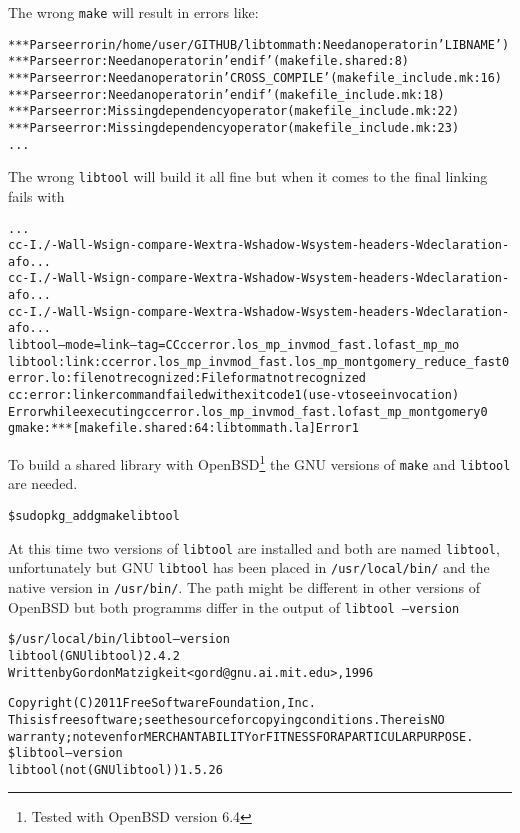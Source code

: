 \documentclass[synpaper]{book}
\begin{document}
The wrong \texttt{make} will result in errors like:
\begin{alltt}
*** Parse error in /home/user/GITHUB/libtommath: Need an operator in 'LIBNAME' )
*** Parse error: Need an operator in 'endif' (makefile.shared:8)
*** Parse error: Need an operator in 'CROSS_COMPILE' (makefile_include.mk:16)
*** Parse error: Need an operator in 'endif' (makefile_include.mk:18)
*** Parse error: Missing dependency operator (makefile_include.mk:22)
*** Parse error: Missing dependency operator (makefile_include.mk:23)
...
\end{alltt}
The wrong \texttt{libtool} will build it all fine but when it comes to the final linking fails with
\begin{alltt}
...
cc -I./ -Wall -Wsign-compare -Wextra -Wshadow -Wsystem-headers -Wdeclaration-afo...
cc -I./ -Wall -Wsign-compare -Wextra -Wshadow -Wsystem-headers -Wdeclaration-afo...
cc -I./ -Wall -Wsign-compare -Wextra -Wshadow -Wsystem-headers -Wdeclaration-afo...
libtool --mode=link --tag=CC cc  error.lo s_mp_invmod_fast.lo fast_mp_mo
libtool: link: cc error.lo s_mp_invmod_fast.lo s_mp_montgomery_reduce_fast0
error.lo: file not recognized: File format not recognized
cc: error: linker command failed with exit code 1 (use -v to see invocation)
Error while executing cc error.lo s_mp_invmod_fast.lo fast_mp_montgomery0
gmake: *** [makefile.shared:64: libtommath.la] Error 1
\end{alltt}

To build a shared library with OpenBSD\footnote{Tested with OpenBSD version 6.4} the GNU versions
of \texttt{make} and \texttt{libtool} are needed.
\begin{alltt}
\$ sudo pkg_add gmake libtool
\end{alltt}
At this time two versions of \texttt{libtool} are installed and both are named \texttt{libtool},
unfortunately but GNU \texttt{libtool} has been placed in \texttt{/usr/local/bin/} and the native
version in \texttt{/usr/bin/}. The path might be different in other versions of OpenBSD but both
programms differ in the output of \texttt{libtool --version}
\begin{alltt}
\$ /usr/local/bin/libtool --version
libtool (GNU libtool) 2.4.2
Written by Gordon Matzigkeit <gord@gnu.ai.mit.edu>, 1996

Copyright (C) 2011 Free Software Foundation, Inc.
This is free software; see the source for copying conditions.  There is NO
warranty; not even for MERCHANTABILITY or FITNESS FOR A PARTICULAR PURPOSE.
\$ libtool --version
libtool (not (GNU libtool)) 1.5.26
\end{alltt}
\end{document}
